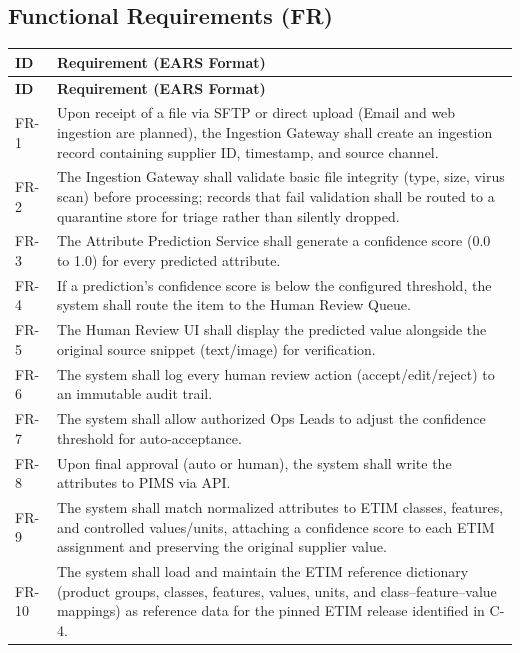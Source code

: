 \documentclass[12pt, a4paper]{article}
\begin{document}
\subsection{Functional Requirements (FR)}
\begin{longtable}{@{}l >{\raggedright\arraybackslash}p{14cm}@{}}
\toprule
\textbf{ID} & \textbf{Requirement (EARS Format)} \\
\midrule
\endfirsthead
\toprule
\textbf{ID} & \textbf{Requirement (EARS Format)} \\
\midrule
\endhead
\bottomrule
\endfoot
\bottomrule
\endlastfoot
FR-1 & Upon receipt of a file via SFTP or direct upload (Email and web ingestion are planned), the Ingestion Gateway shall create an ingestion record containing supplier ID, timestamp, and source channel. \\
\addlinespace
FR-2 & The Ingestion Gateway shall validate basic file integrity (type, size, virus scan) before processing; records that fail validation shall be routed to a quarantine store for triage rather than silently dropped. \\
\addlinespace
FR-3 & The Attribute Prediction Service shall generate a confidence score (0.0 to 1.0) for every predicted attribute. \\
\addlinespace
FR-4 & If a prediction's confidence score is below the configured threshold, the system shall route the item to the Human Review Queue. \\
\addlinespace
FR-5 & The Human Review UI shall display the predicted value alongside the original source snippet (text/image) for verification. \\
\addlinespace
FR-6 & The system shall log every human review action (accept/edit/reject) to an immutable audit trail. \\
\addlinespace
FR-7 & The system shall allow authorized Ops Leads to adjust the confidence threshold for auto-acceptance. \\
\addlinespace
FR-8 & Upon final approval (auto or human), the system shall write the attributes to PIMS via API. \\
\addlinespace
FR-9 & The system shall match normalized attributes to ETIM classes, features, and controlled values/units, attaching a confidence score to each ETIM assignment and preserving the original supplier value. \\
\addlinespace
FR-10 & The system shall load and maintain the ETIM reference dictionary (product groups, classes, features, values, units, and class--feature--value mappings) as reference data for the pinned ETIM release identified in C-4. \\
\end{longtable}
\end{document}
